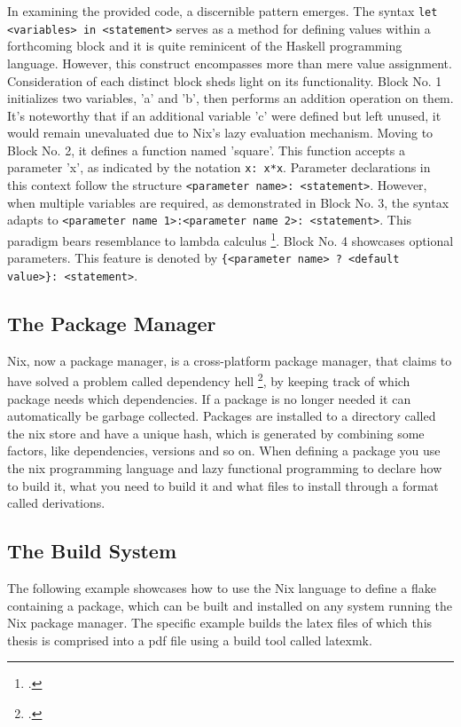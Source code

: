 In examining the provided code, a discernible pattern emerges. The syntax \newline \verb+let <variables> in <statement>+ serves as a method for defining values within a forthcoming block and it is quite reminicent of the Haskell programming language. However, this construct encompasses more than mere value assignment.
Consideration of each distinct block sheds light on its functionality. Block No. 1 initializes two variables, 'a' and 'b', then performs an addition operation on them. It's noteworthy that if an additional variable 'c' were defined but left unused, it would remain unevaluated due to Nix's lazy evaluation mechanism.
Moving to Block No. 2, it defines a function named 'square'. This function accepts a parameter 'x', as indicated by the notation \verb+x: x*x+. Parameter declarations in this context follow the structure \verb+<parameter name>: <statement>+. However, when multiple variables are required, as demonstrated in Block No. 3, the syntax adapts to \verb+<parameter name 1>:<parameter name 2>: <statement>+. This paradigm bears resemblance to lambda calculus \footcite{lambda_calculus}.
Block No. 4 showcases optional parameters. This feature is denoted by \newline \verb+{<parameter name> ? <default value>}: <statement>+.


\subsection{The Package Manager}
Nix, now a package manager, is a cross-platform package manager, that claims to have solved a problem called dependency hell \footcite{dependency_hell}, by keeping track of which package needs which dependencies. If a package is no longer needed it can automatically be garbage collected. Packages are installed to a directory called the nix store and have a unique hash, which is generated by combining some factors, like dependencies, versions and so on.
When defining a package you use the nix programming language and lazy functional programming to declare how to build it, what you need to build it and what files to install through a format called derivations.

\subsection{The Build System}
The following example showcases how to use the Nix language to define a flake containing a package, which can be built and installed on any system running the Nix package manager.
The specific example builds the latex files of which this thesis is comprised into a pdf file using a build tool called latexmk.
\medskip

